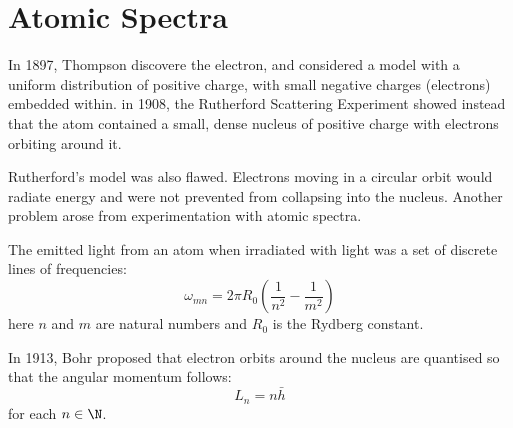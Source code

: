 \documentclass[../Main.tex]{subfiles}
\begin{document}
\section{Atomic Spectra}
In 1897, Thompson discovere the electron, and considered a model with a uniform distribution of positive charge, with small negative charges (electrons) embedded within. in 1908, the Rutherford Scattering Experiment showed instead that the atom contained a small, dense nucleus of positive charge with electrons orbiting around it.

Rutherford's model was also flawed. Electrons moving in a circular orbit would radiate energy and were not prevented from collapsing into the nucleus. Another problem arose from experimentation with atomic spectra.

The emitted light from an atom when irradiated with light was a set of discrete lines of frequencies:
\begin{equation}
    \omega_{mn} = 2\pi R_0 \left(\frac{1}{n^2} - \frac1{m^2}\right)
    \label{eqnAtomSpectra}
\end{equation}
here $n$ and $m$ are natural numbers and $R_0$ is the Rydberg constant.

In 1913, Bohr proposed that electron orbits around the nucleus are quantised so that the angular momentum follows: \begin{equation}
    L_n = n \bar{h}
    \label{eqnQuantisedL}
\end{equation}
for each $n \in \N$.
\end{document}
